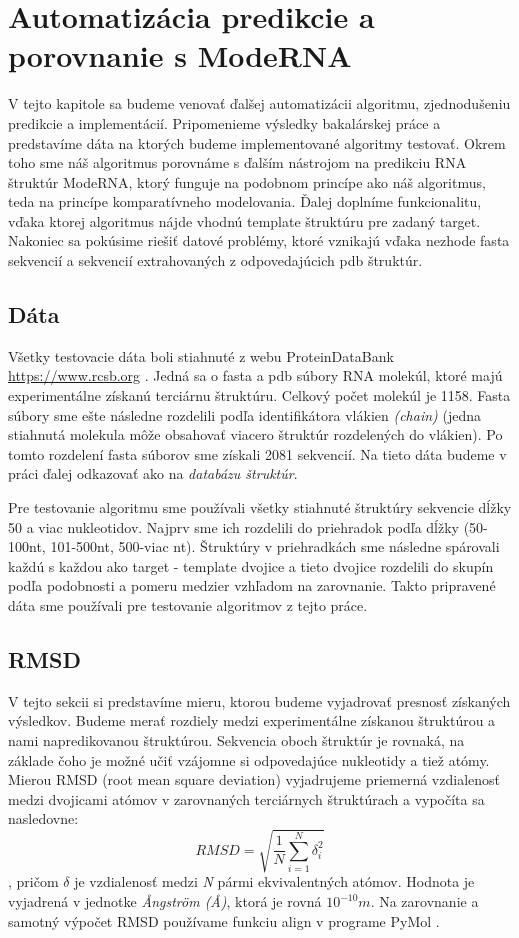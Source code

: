 \chapter{Automatizácia predikcie a porovnanie s ModeRNA}

V tejto kapitole sa budeme venovať ďalšej automatizácii algoritmu, zjednodušeniu predikcie a implementácií. Pripomenieme výsledky bakalárskej práce a predstavíme dáta na ktorých budeme implementované algoritmy testovať. Okrem toho sme náš algoritmus porovnáme s ďalším nástrojom na predikciu RNA štruktúr ModeRNA, ktorý funguje na podobnom princípe ako náš algoritmus, teda na princípe komparatívneho modelovania. Ďalej doplníme funkcionalitu, vďaka ktorej algoritmus nájde vhodnú template štruktúru pre zadaný target. Nakoniec sa pokúsime riešiť datové problémy, ktoré vznikajú vďaka nezhode fasta sekvencií a sekvencií extrahovaných z odpovedajúcich pdb štruktúr. 

\section{Dáta}
Všetky testovacie dáta boli stiahnuté z webu ProteinDataBank \url{https://www.rcsb.org} \cite{PDB00}. Jedná sa o fasta a pdb súbory RNA molekúl, ktoré majú experimentálne získanú terciárnu štruktúru. Celkový počet molekúl je 1158. Fasta súbory sme ešte následne rozdelili podľa identifikátora vlákien \textit{(chain)} (jedna stiahnutá molekula môže obsahovať viacero štruktúr rozdelených do vlákien). Po tomto rozdelení fasta súborov sme získali 2081 sekvencií. Na tieto dáta budeme v práci ďalej odkazovať ako na \textit{databázu štruktúr}.

\indent Pre testovanie algoritmu sme používali všetky stiahnuté štruktúry sekvencie dĺžky 50 a viac nukleotidov. Najprv sme ich rozdelili do priehradok podľa dĺžky (50-100nt, 101-500nt, 500-viac nt). Štruktúry v priehradkách sme následne spárovali každú s každou ako target - template dvojice a tieto dvojice rozdelili do skupín podľa podobnosti a pomeru medzier vzhľadom na zarovnanie. Takto pripravené dáta sme používali pre testovanie algoritmov z tejto práce.


\section{RMSD}
V tejto sekcii si predstavíme mieru, ktorou budeme vyjadrovať presnosť získaných výsledkov. Budeme merať rozdiely medzi experimentálne získanou štruktúrou a nami napredikovanou štruktúrou. Sekvencia oboch štruktúr je rovnaká, na základe čoho je možné učiť vzájomne si odpovedajúce nukleotidy a tiež atómy. Mierou RMSD (root mean square deviation) vyjadrujeme priemerná vzdialenosť medzi dvojicami atómov v zarovnaných terciárnych štruktúrach a vypočíta sa nasledovne:
$$RMSD = \sqrt{ \frac{1}{N} \sum_{i=1}^{N} \delta_i ^ {2}}$$, pričom $\delta$ je vzdialenosť medzi \textit{N} pármi ekvivalentných atómov. Hodnota je vyjadrená  v  jednotke \textit{Ångström (Å)}, ktorá je rovná  $10^{-10}m$. Na zarovnanie a samotný výpočet RMSD používame funkciu align v programe PyMol \cite{PyMOL}.


